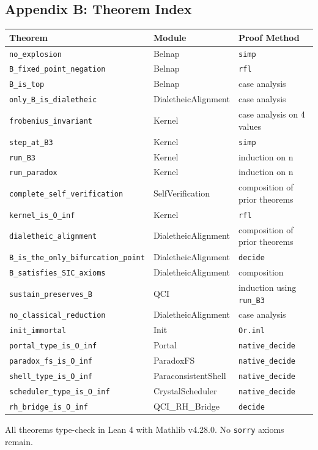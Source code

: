 \documentclass[12pt,a4paper]{article}
\begin{document}
\subsection{Appendix B: Theorem Index}

\begin{table}[htbp]
\centering
\small
{}
\begin{tabularx}{\textwidth}{>{\centering\arraybackslash}X >{\centering\arraybackslash}X >{\centering\arraybackslash}X}
\toprule
\rowcolor{gray!25}\textbf{Theorem} & \textbf{Module} & \textbf{Proof Method} \\
\midrule
\rowcolors{1}{white}{gray!10}
\texttt{no\_explosion} & Belnap & \texttt{simp} \\
\texttt{B\_fixed\_point\_negation} & Belnap & \texttt{rfl} \\
\texttt{B\_is\_top} & Belnap & case analysis \\
\texttt{only\_B\_is\_dialetheic} & DialetheicAlignment & case analysis \\
\texttt{frobenius\_invariant} & Kernel & case analysis on 4 values \\
\texttt{step\_at\_B3} & Kernel & \texttt{simp} \\
\texttt{run\_B3} & Kernel & induction on n \\
\texttt{run\_paradox} & Kernel & induction on n \\
\texttt{complete\_self\_verification} & SelfVerification & composition of prior theorems \\
\texttt{kernel\_is\_O\_inf} & Kernel & \texttt{rfl} \\
\texttt{dialetheic\_alignment} & DialetheicAlignment & composition of prior theorems \\
\texttt{B\_is\_the\_only\_bifurcation\_point} & DialetheicAlignment & \texttt{decide} \\
\texttt{B\_satisfies\_SIC\_axioms} & DialetheicAlignment & composition \\
\texttt{sustain\_preserves\_B} & QCI & induction using \texttt{run\_B3} \\
\texttt{no\_classical\_reduction} & DialetheicAlignment & case analysis \\
\texttt{init\_immortal} & Init & \texttt{Or.inl} \\
\texttt{portal\_type\_is\_O\_inf} & Portal & \texttt{native\_decide} \\
\texttt{paradox\_fs\_is\_O\_inf} & ParadoxFS & \texttt{native\_decide} \\
\texttt{shell\_type\_is\_O\_inf} & ParaconsistentShell & \texttt{native\_decide} \\
\texttt{scheduler\_type\_is\_O\_inf} & CrystalScheduler & \texttt{native\_decide} \\
\texttt{rh\_bridge\_is\_O\_inf} & QCI\_RH\_Bridge & \texttt{decide} \\
\bottomrule
\end{tabularx}
\end{table}

All theorems type-check in Lean 4 with Mathlib v4.28.0. No \texttt{sorry} axioms remain.
\end{document}
